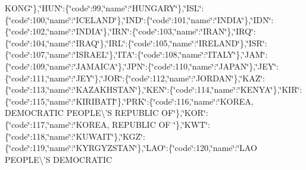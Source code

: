 \begin{DoxyCompactItemize}
K\-O\-N\-G\char`\"{}\},\char`\"{}H\-U\-N\char`\"{}\-:\{\char`\"{}code\char`\"{}\-:99,\char`\"{}name\char`\"{}\-:\char`\"{}H\-U\-N\-G\-A\-R\-Y\char`\"{}\},\char`\"{}I\-S\-L\char`\"{}\-:\{\char`\"{}code\char`\"{}\-:100,\char`\"{}name\char`\"{}\-:\char`\"{}I\-C\-E\-L\-A\-N\-D\char`\"{}\},\char`\"{}I\-N\-D\char`\"{}\-:\{\char`\"{}code\char`\"{}\-:101,\char`\"{}name\char`\"{}\-:\char`\"{}I\-N\-D\-I\-A\char`\"{}\},\char`\"{}I\-D\-N\char`\"{}\-:\{\char`\"{}code\char`\"{}\-:102,\char`\"{}name\char`\"{}\-:\char`\"{}I\-N\-D\-I\-A\char`\"{}\},\char`\"{}I\-R\-N\char`\"{}\-:\{\char`\"{}code\char`\"{}\-:103,\char`\"{}name\char`\"{}\-:\char`\"{}I\-R\-A\-N\char`\"{}\},\char`\"{}I\-R\-Q\char`\"{}\-:\{\char`\"{}code\char`\"{}\-:104,\char`\"{}name\char`\"{}\-:\char`\"{}I\-R\-A\-Q\char`\"{}\},\char`\"{}I\-R\-L\char`\"{}\-:\{\char`\"{}code\char`\"{}\-:105,\char`\"{}name\char`\"{}\-:\char`\"{}I\-R\-E\-L\-A\-N\-D\char`\"{}\},\char`\"{}I\-S\-R\char`\"{}\-:\{\char`\"{}code\char`\"{}\-:107,\char`\"{}name\char`\"{}\-:\char`\"{}I\-S\-R\-A\-E\-L\char`\"{}\},\char`\"{}I\-T\-A\char`\"{}\-:\{\char`\"{}code\char`\"{}\-:108,\char`\"{}name\char`\"{}\-:\char`\"{}I\-T\-A\-L\-Y\char`\"{}\},\char`\"{}J\-A\-M\char`\"{}\-:\{\char`\"{}code\char`\"{}\-:109,\char`\"{}name\char`\"{}\-:\char`\"{}J\-A\-M\-A\-I\-C\-A\char`\"{}\},\char`\"{}J\-P\-N\char`\"{}\-:\{\char`\"{}code\char`\"{}\-:110,\char`\"{}name\char`\"{}\-:\char`\"{}J\-A\-P\-A\-N\char`\"{}\},\char`\"{}J\-E\-Y\char`\"{}\-:\{\char`\"{}code\char`\"{}\-:111,\char`\"{}name\char`\"{}\-:\char`\"{}J\-E\-Y\char`\"{}\},\char`\"{}J\-O\-R\char`\"{}\-:\{\char`\"{}code\char`\"{}\-:112,\char`\"{}name\char`\"{}\-:\char`\"{}J\-O\-R\-D\-A\-N\char`\"{}\},\char`\"{}K\-A\-Z\char`\"{}\-:\{\char`\"{}code\char`\"{}\-:113,\char`\"{}name\char`\"{}\-:\char`\"{}K\-A\-Z\-A\-K\-H\-S\-T\-A\-N\char`\"{}\},\char`\"{}K\-E\-N\char`\"{}\-:\{\char`\"{}code\char`\"{}\-:114,\char`\"{}name\char`\"{}\-:\char`\"{}K\-E\-N\-Y\-A\char`\"{}\},\char`\"{}K\-I\-R\char`\"{}\-:\{\char`\"{}code\char`\"{}\-:115,\char`\"{}name\char`\"{}\-:\char`\"{}K\-I\-R\-I\-B\-A\-T\-I\char`\"{}\},\char`\"{}P\-R\-K\char`\"{}\-:\{\char`\"{}code\char`\"{}\-:116,\char`\"{}name\char`\"{}\-:\char`\"{}K\-O\-R\-E\-A, D\-E\-M\-O\-C\-R\-A\-T\-I\-C P\-E\-O\-P\-L\-E\textbackslash{}'S R\-E\-P\-U\-B\-L\-I\-C O\-F\char`\"{}\},\char`\"{}K\-O\-R\char`\"{}\-:\{\char`\"{}code\char`\"{}\-:117,\char`\"{}name\char`\"{}\-:\char`\"{}K\-O\-R\-E\-A, R\-E\-P\-U\-B\-L\-I\-C O\-F \char`\"{}\},\char`\"{}K\-W\-T\char`\"{}\-:\{\char`\"{}code\char`\"{}\-:118,\char`\"{}name\char`\"{}\-:\char`\"{}K\-U\-W\-A\-I\-T\char`\"{}\},\char`\"{}K\-G\-Z\char`\"{}\-:\{\char`\"{}code\char`\"{}\-:119,\char`\"{}name\char`\"{}\-:\char`\"{}K\-Y\-R\-G\-Y\-Z\-S\-T\-A\-N\char`\"{}\},\char`\"{}L\-A\-O\char`\"{}\-:\{\char`\"{}code\char`\"{}\-:120,\char`\"{}name\char`\"{}\-:\char`\"{}L\-A\-O P\-E\-O\-P\-L\-E\textbackslash{}'S D\-E\-M\-O\-C\-R\-A\-T\-I\-C 
\end{DoxyCompactItemize}
